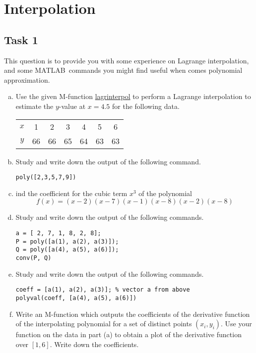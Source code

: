 \chapter{Interpolation}


\section*{Task 1}
This question is to provide you with some experience on Lagrange interpolation, and some MATLAB\texttrademark\ commands you might find useful when comes polynomial approximation.
\begin{enumerate}[(a)]
	\item Use the given M-function \hyperref[lagrinterpol]{lagrinterpol} to perform a Lagrange interpolation to estimate the \(y\)-value at \(x = 4.5\) for the following data.
	\begin{center}
	\begin{tabular}{ccccccc}
	\(x\)	&	1	&	2	&	3	&	4	&	5	&	6	\\
	\(y\)	&	66	&	66	&	65	&	64	&	63	&	63	\\
	\end{tabular}
	\end{center}
	\item Study and write down the output of the following command.
	\begin{lstlisting}[style=Matlab-editor]
poly([2,3,5,7,9])
	\end{lstlisting}
	\item ind the coefficient for the cubic term \(x^3\) of the polynomial
	\[ f(x)=(x-2)(x-7)(x-1)(x-8)(x-2)(x-8) \]
	\item Study and write down the output of the following commands.
	\begin{lstlisting}[style=Matlab-editor]
a = [ 2, 7, 1, 8, 2, 8];
P = poly([a(1), a(2), a(3)]);
Q = poly([a(4), a(5), a(6)]);
conv(P, Q)
	\end{lstlisting}
	\item  Study and write down the output of the following commands.
	\begin{lstlisting}[style=Matlab-editor]
coeff = [a(1), a(2), a(3)]; % vector a from above
polyval(coeff, [a(4), a(5), a(6)])
	\end{lstlisting}
	\item Write an M-function which outputs the coefficients of the derivative function of the interpolating polynomial for a set of distinct points \((x_i, y_i)\).
	Use your function on the data in part (a) to obtain a plot of the derivative function over \([1, 6]\).
	Write down the coefficients.
\end{enumerate}


